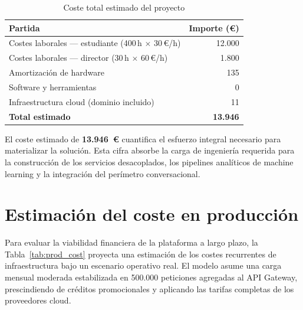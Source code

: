 \begin{table}[H]
  \centering
  \caption{Coste total estimado del proyecto}
  \label{tab:coste_total}
  \begin{tabular}{lr}
    \toprule
    \textbf{Partida}                                        & \textbf{Importe (€)} \\
    \midrule
    Costes laborales — estudiante (400\,h $\times$ 30\,€/h) & 12.000               \\
    Costes laborales — director (30\,h $\times$ 60\,€/h)    & 1.800                \\
    Amortización de hardware                                & 135                  \\
    Software y herramientas                                 & 0                    \\
    Infraestructura cloud (dominio incluido)                & 11                   \\
    \midrule
    \textbf{Total estimado}                                 & \textbf{13.946}      \\
    \bottomrule
  \end{tabular}
\end{table}

El coste estimado de \textbf{13.946~€} cuantifica el esfuerzo integral necesario para materializar la solución.
Esta cifra absorbe la carga de ingeniería requerida para la construcción de los servicios desacoplados, los pipelines
analíticos de machine learning y la integración del perímetro conversacional.

\section{Estimación del coste en producción}
\label{subsec:infra_prod}
Para evaluar la viabilidad financiera de la plataforma a largo plazo, la Tabla~\ref{tab:prod_cost}
proyecta una estimación de los costes recurrentes de infraestructura bajo un escenario operativo real.
El modelo asume una carga mensual moderada estabilizada en 500.000 peticiones agregadas al API Gateway,
prescindiendo de créditos promocionales y aplicando las tarifas completas de los proveedores cloud.

